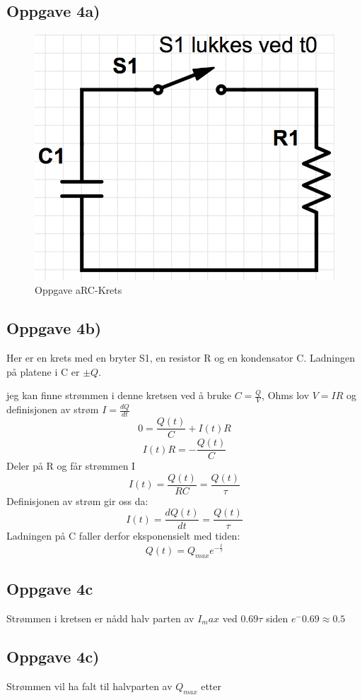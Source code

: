 \documentclass[12pt,a4paper,final,leqno]{report}
\begin{document}
\subsection*{Oppgave 4a)}
\begin{figure}[H]
\caption{ Oppgave aRC-Krets }
\centering
\includegraphics[width=\textwidth]{krets1.jpg}
\end{figure}
\subsection*{Oppgave 4b)}
Her er en krets med en bryter S1, en resistor R og en kondensator C. Ladningen på platene i C er $\pm Q$.

jeg kan finne strømmen i denne kretsen ved å bruke $C=\frac{Q}{V}$, Ohms lov $V=IR$ og definisjonen av strøm $I=\frac{dQ}{dt}$
$$
0=\frac{Q(t)}{C}+I(t)R
$$
$$
I(t)R=-\frac{Q(t)}{C} 
$$
Deler på R og får strømmen I
$$
I(t)=\frac{Q(t)}{RC}=\frac{Q(t)}{\tau}
$$
Definisjonen av strøm gir oss da:
$$
I(t)=\frac{dQ(t)}{dt}=\frac{Q(t)}{\tau}
$$
Ladningen på C faller derfor eksponensielt med tiden:
$$
Q(t)=Q_{max}e^{-\frac{t}{\tau}}
$$
\subsection*{Oppgave 4c}
Strømmen i kretsen er nådd halv parten av $I_max$ ved $0.69 \tau$ siden $e^-0.69\approx 0.5$

\subsection*{Oppgave 4c)}
Strømmen vil ha falt til halvparten av $Q_{max}$ etter 
\end{document}
